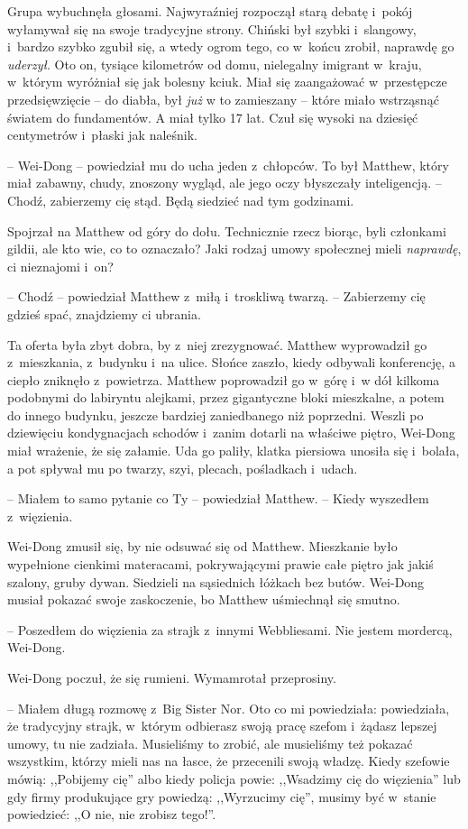 \documentclass[oneside,polish,11pt,rmheadings]{mwbk}
\begin{document}
Grupa wybuchnęła głosami. Najwyraźniej rozpoczął starą debatę i~pokój wyłamywał się na swoje tradycyjne strony. Chiński był szybki i~slangowy, i~bardzo szybko zgubił się, a wtedy ogrom tego, co w~końcu zrobił, naprawdę go \textit{uderzył}. Oto on, tysiące kilometrów od domu, nielegalny imigrant w~kraju, w~którym wyróżniał się jak bolesny kciuk. Miał się zaangażować w~przestępcze przedsięwzięcie -- do diabła, był \textit{już }w to zamieszany -- które miało wstrząsnąć światem do fundamentów. A miał tylko 17 lat. Czuł się wysoki na dziesięć centymetrów i~płaski jak naleśnik.

-- Wei-Dong -- powiedział mu do ucha jeden z~chłopców. To był Matthew, który miał zabawny, chudy, znoszony wygląd, ale jego oczy błyszczały inteligencją. -- Chodź, zabierzemy cię stąd. Będą siedzieć nad tym godzinami.

Spojrzał na Matthew od góry do dołu. Technicznie rzecz biorąc, byli członkami gildii, ale kto wie, co to oznaczało? Jaki rodzaj umowy społecznej mieli \textit{naprawdę}, ci nieznajomi i~on?

-- Chodź -- powiedział Matthew z~miłą i~troskliwą twarzą. -- Zabierzemy cię gdzieś spać, znajdziemy ci ubrania.

Ta oferta była zbyt dobra, by z~niej zrezygnować. Matthew wyprowadził go z~mieszkania, z~budynku i~na ulice. Słońce zaszło, kiedy odbywali konferencję, a ciepło zniknęło z~powietrza. Matthew poprowadził go w~górę i~w dół kilkoma podobnymi do labiryntu alejkami, przez gigantyczne bloki mieszkalne, a potem do innego budynku, jeszcze bardziej zaniedbanego niż poprzedni. Weszli po dziewięciu kondygnacjach schodów i~zanim dotarli na właściwe piętro, Wei-Dong miał wrażenie, że się załamie. Uda go paliły, klatka piersiowa unosiła się i~bolała, a pot spływał mu po twarzy, szyi, plecach, pośladkach i~udach.

-- Miałem to samo pytanie co Ty -- powiedział Matthew. -- Kiedy wyszedłem z~więzienia.

Wei-Dong zmusił się, by nie odsuwać się od Matthew. Mieszkanie było wypełnione cienkimi materacami, pokrywającymi prawie całe piętro jak jakiś szalony, gruby dywan. Siedzieli na sąsiednich łóżkach bez butów. Wei-Dong musiał pokazać swoje zaskoczenie, bo Matthew uśmiechnął się smutno. 

-- Poszedłem do więzienia za strajk z~innymi Webbliesami. Nie jestem mordercą, Wei-Dong.

Wei-Dong poczuł, że się rumieni. Wymamrotał przeprosiny.

-- Miałem długą rozmowę z~Big Sister Nor. Oto co mi powiedziała: powiedziała, że tradycyjny strajk, w~którym odbierasz swoją pracę szefom i~żądasz lepszej umowy, tu nie zadziała. Musieliśmy to zrobić, ale musieliśmy też pokazać wszystkim, którzy mieli nas na łasce, że przecenili swoją władzę. Kiedy szefowie mówią: ,,Pobijemy cię'' albo kiedy policja powie: ,,Wsadzimy cię do więzienia'' lub gdy firmy produkujące gry powiedzą: ,,Wyrzucimy cię'', musimy być w~stanie powiedzieć: ,,O nie, nie zrobisz tego!''.
\end{document}
